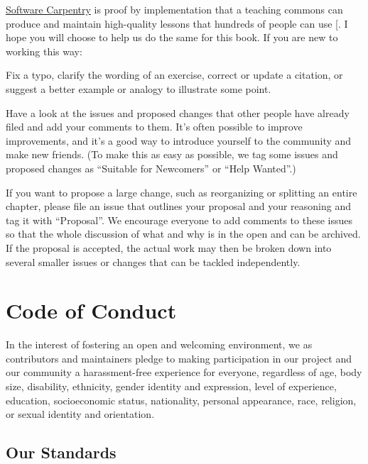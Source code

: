 \href{http://software-carpentry.org}{Software Carpentry} is proof by implementation that a teaching
commons can produce and maintain high-quality lessons that hundreds of
people can use {[}\protect[\hyperlink{b:Wils2016}{Wils2016}]{]}. I hope you will choose to help us
do the same for this book. If you are new to working this way:

\begin{description}
\tightlist
\item[Start small.]
Fix a typo, clarify the wording of an exercise, correct or update a
citation, or suggest a better example or analogy to illustrate some
point.
\item[Join the conversation.]
Have a look at the issues and proposed changes that other people
have already filed and add your comments to them. It's often
possible to improve improvements, and it's a good way to introduce
yourself to the community and make new friends. (To make this as
easy as possible, we tag some issues and proposed changes as
``Suitable for Newcomers'' or ``Help Wanted''.)
\item[Discuss, then edit.]
If you want to propose a large change, such as reorganizing or
splitting an entire chapter, please file an issue that outlines your
proposal and your reasoning and tag it with ``Proposal''. We encourage
everyone to add comments to these issues so that the whole
discussion of what and why is in the open and can be archived. If
the proposal is accepted, the actual work may then be broken down
into several smaller issues or changes that can be tackled
independently.
\end{description}

\chapter{Code of Conduct}\label{s:conduct}

In the interest of fostering an open and welcoming environment, we as
contributors and maintainers pledge to making participation in our
project and our community a harassment-free experience for everyone,
regardless of age, body size, disability, ethnicity, gender identity
and expression, level of experience, education, socioeconomic status,
nationality, personal appearance, race, religion, or sexual identity
and orientation.

\section{Our Standards}\label{our-standards}


